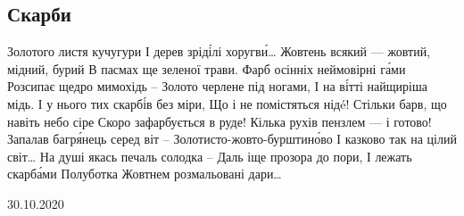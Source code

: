  
 
 

\subsection{Скарби}
\label{sec:31_10_2020.fb.ivan_gentosh.1.skarby}

Золотого листя кучугури
І дерев зріді́лі хоругви́…
Жовтень всякий --- жовтий, мідний, бурий
В пасмах ще зеленої трави.
Фарб осінніх неймовірні га́ми
Розсипає щедро мимохідь –
Золото черлене під ногами,
І на ві́тті найщиріша мідь.
І у нього тих скарбі́в без міри,
Що і не помістяться нідé!
Стільки барв, що навіть небо сіре
Скоро зафарбується в руде!
Кілька рухів пензлем --- і готово!
Запалав багря́нець серед віт –
Золотисто-жовто-бурштино́во
І казково так на цілий світ…
На душі якась печаль солодка –
Даль іще прозора до пори,
І лежать скарба́ми Полуботка
Жовтнем розмальовані дари…

30.10.2020
